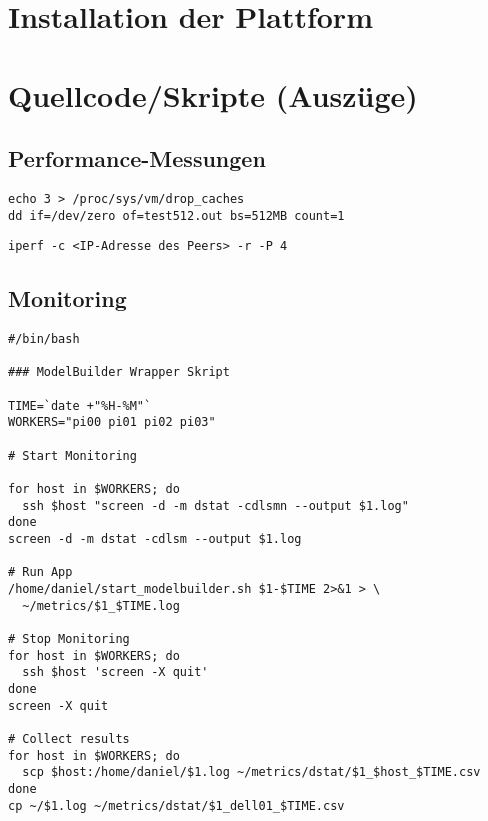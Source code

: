 \begin{appendices}
\section{Installation der Plattform}
\section{Quellcode/Skripte (Auszüge)}
\subsection{Performance-Messungen}

\begin{lstlisting}[caption={Messung der Festplattenperformance - Beispiel: Schreiben einer 512MB Datei},label={lst:measure_harddrive}]
echo 3 > /proc/sys/vm/drop_caches
dd if=/dev/zero of=test512.out bs=512MB count=1
\end{lstlisting}

\begin{lstlisting}[caption={Messung der Netzwerkperformance},label={lst:measure_network}]
iperf -c <IP-Adresse des Peers> -r -P 4
\end{lstlisting}

\subsection{Monitoring}

\begin{lstlisting}[caption={Monitoring des Clusters (Betriebssystem), Beispiel ModelBuilder},label={lst:monitor_cluster}]
#/bin/bash

### ModelBuilder Wrapper Skript

TIME=`date +"%H-%M"`
WORKERS="pi00 pi01 pi02 pi03"

# Start Monitoring
	
for host in $WORKERS; do
  ssh $host "screen -d -m dstat -cdlsmn --output $1.log"
done
screen -d -m dstat -cdlsm --output $1.log

# Run App
/home/daniel/start_modelbuilder.sh $1-$TIME 2>&1 > \
  ~/metrics/$1_$TIME.log 

# Stop Monitoring
for host in $WORKERS; do
  ssh $host 'screen -X quit'
done
screen -X quit

# Collect results
for host in $WORKERS; do
  scp $host:/home/daniel/$1.log ~/metrics/dstat/$1_$host_$TIME.csv
done
cp ~/$1.log ~/metrics/dstat/$1_dell01_$TIME.csv


\end{lstlisting}
\end{appendices}
